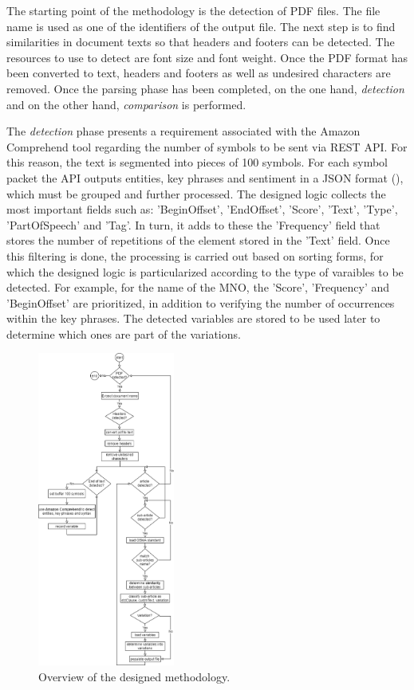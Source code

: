 \documentclass[conference]{style/IEEEtran}
\begin{document}
The starting point of the methodology is the detection of PDF files. The file name is used as one of the identifiers of the output file. The next step is to find similarities in document texts so that headers and footers can be detected. The resources to use to detect are font size and font weight. Once the PDF format has been converted to text, headers and footers as well as undesired characters are removed. Once the parsing phase has been completed, on the one hand, \textit{detection} and on the other hand, \textit{comparison} is performed.

The \textit{detection} phase presents a requirement associated with the Amazon Comprehend tool regarding the number of symbols to be sent via REST API. For this reason, the text is segmented into pieces of 100 symbols. For each symbol packet the API outputs entities, key phrases and sentiment in a JSON format (\cite{AWS2021}), which must be grouped and further processed. The designed logic collects the most important fields such as: 'BeginOffset', 'EndOffset', 'Score', 'Text', 'Type', 'PartOfSpeech' and 'Tag'. In turn, it adds to these the 'Frequency' field that stores the number of repetitions of the element stored in the 'Text' field. Once this filtering is done, the processing is carried out based on sorting forms, for which the designed logic is particularized according to the type of varaibles to be detected. For example, for the name of the MNO, the 'Score', 'Frequency' and 'BeginOffset' are prioritized, in addition to verifying the number of occurrences within the key phrases. The detected variables are stored to be used later to determine which ones are part of the variations.

\begin{figure}[htbp]
\centerline{\includegraphics[width=0.4\textwidth]{images/methodology.png}}
\caption{Overview of the designed methodology.}
\label{fig1}
\end{figure}
\end{document}

